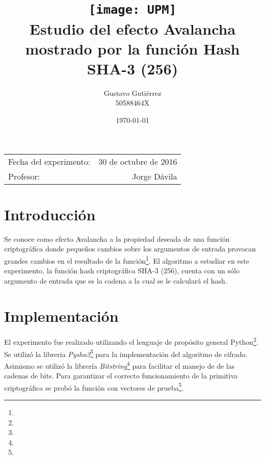 \documentclass[a4paper]{article}
\title{\texttt{[image: UPM]} \\ 
Estudio del efecto Avalancha \\ mostrado por la función Hash \\ SHA-3 (256)} %
\author{Gustavo Gutiérrez \\ 50588464X} %
\date{\today} %
\begin{document}
\maketitle %

\begin{center}
\begin{tabular}{l r}
Fecha del experimento: & 30 de octubre de 2016 \\
Profesor: & Jorge Dávila %
\end{tabular}
\end{center}

\clearpage

\tableofcontents{}

\clearpage


\section{Introducción}

Se conoce como efecto Avalancha a la propiedad deseada de una función criptográfica donde pequeños cambios sobre los argumentos
de entrada provocan grandes cambios en el resultado de la función\footnote{}.
El algoritmo a estudiar en este experimento, la función hash criptográfica SHA-3 (256), cuenta con un sólo argumento de entrada 
que es la cadena a la cual se le calculará el hash.

\section{Implementación}

El experimento fue realizado utilizando el lenguaje de propósito general Python\footnote{}. 
Se utilizó la libreria \emph{Pysha3}\footnote{} para la implementación del algoritmo
de cifrado. Asimismo se utilizó la librería \emph{Bitstring}\footnote{} para 
facilitar el manejo de de las cadenas de bits. Para garantizar el correcto funcionamiento de la primitiva criptográfica se 
probó la función con vectores de prueba\footnote{}. 
\end{document}
